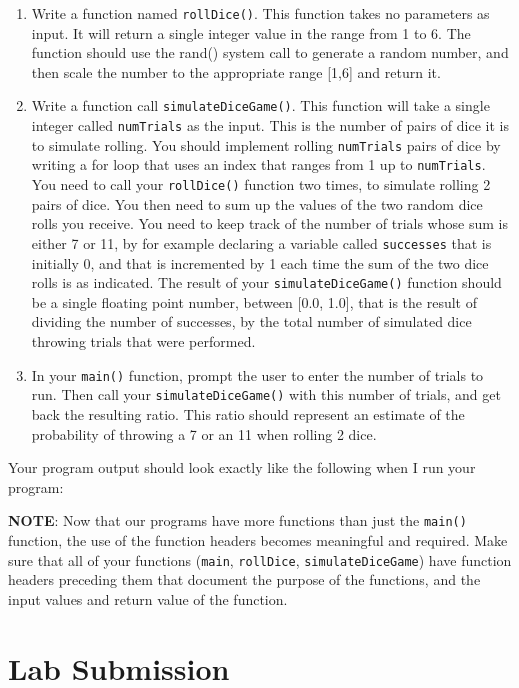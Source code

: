 \documentclass[11pt]{article}
\begin{document}
\begin{enumerate}
\item Write a function named \verb~rollDice()~.  This function takes no
parameters as input.  It will return a single integer value in the
range from 1 to 6.  The function should use the rand()
system call to generate a random number, and then scale the
number to the appropriate range [1,6] and return it.

\item Write a function call \verb~simulateDiceGame()~.  This function will
take a single integer called \verb~numTrials~ as the input.  This is the
number of pairs of dice it is to simulate rolling.  You should
implement rolling \verb~numTrials~ pairs of dice by writing a for loop
that uses an index that ranges from 1 up to \verb~numTrials~.  You need
to call your \verb~rollDice()~ function two times, to simulate rolling 2
pairs of dice.  You then need to sum up the values of the two
random dice rolls you receive.  You need to keep track of the
number of trials whose sum is either 7 or 11, by for example
declaring a variable called \verb~successes~ that is initially 0, and
that is incremented by 1 each time the sum of the two dice rolls is
as indicated.  The result of your \verb~simulateDiceGame()~ function should
be a single floating point number, between [0.0, 1.0], that is the
result of dividing the number of successes, by the total number of
simulated dice throwing trials that were performed.

\item In your \verb~main()~ function, prompt the user to enter the number of
trials to run.  Then call your \verb~simulateDiceGame()~ with this
number of trials, and get back the resulting ratio.  This ratio
should represent an estimate of the probability of throwing a 7 or
an 11 when rolling 2 dice.
\end{enumerate}

Your program output should look exactly like the following when I
run your program:

\textbf{NOTE}: Now that our programs have more functions than just the
\verb~main()~ function, the use of the function headers becomes meaningful
and required.  Make sure that all of your functions (\verb~main~,
\verb~rollDice~, \verb~simulateDiceGame~) have function headers preceding them
that document the purpose of the functions, and the input values and
return value of the function.
\section*{Lab Submission}
\label{sec-4}
\end{document}
